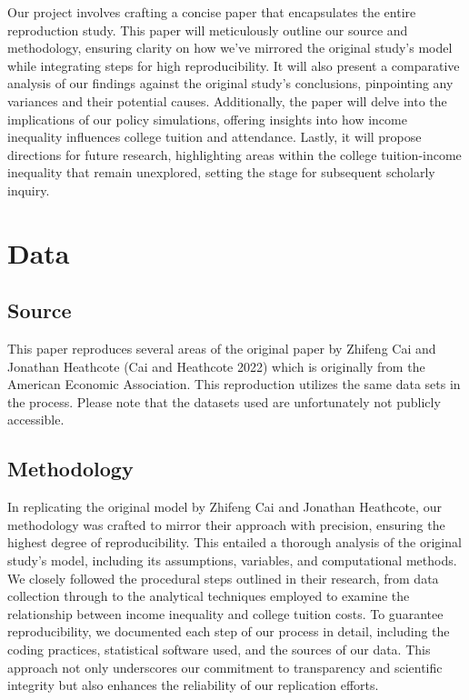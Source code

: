 \documentclass[
  letterpaper,
  DIV=11,
  numbers=noendperiod]{scrartcl}
\begin{document}
Our project involves crafting a concise paper that encapsulates the
entire reproduction study. This paper will meticulously outline our
source and methodology, ensuring clarity on how we've mirrored the
original study's model while integrating steps for high reproducibility.
It will also present a comparative analysis of our findings against the
original study's conclusions, pinpointing any variances and their
potential causes. Additionally, the paper will delve into the
implications of our policy simulations, offering insights into how
income inequality influences college tuition and attendance. Lastly, it
will propose directions for future research, highlighting areas within
the college tuition-income inequality that remain unexplored, setting
the stage for subsequent scholarly inquiry.

\section{Data}\label{sec-data}

\subsection{Source}\label{source}

This paper reproduces several areas of the original paper by Zhifeng Cai
and Jonathan Heathcote (Cai and Heathcote 2022) which is originally from
the American Economic Association. This reproduction utilizes the same
data sets in the process. Please note that the datasets used are
unfortunately not publicly accessible.

\subsection{Methodology}\label{methodology}

In replicating the original model by Zhifeng Cai and Jonathan Heathcote,
our methodology was crafted to mirror their approach with precision,
ensuring the highest degree of reproducibility. This entailed a thorough
analysis of the original study's model, including its assumptions,
variables, and computational methods. We closely followed the procedural
steps outlined in their research, from data collection through to the
analytical techniques employed to examine the relationship between
income inequality and college tuition costs. To guarantee
reproducibility, we documented each step of our process in detail,
including the coding practices, statistical software used, and the
sources of our data. This approach not only underscores our commitment
to transparency and scientific integrity but also enhances the
reliability of our replication efforts.
\end{document}
